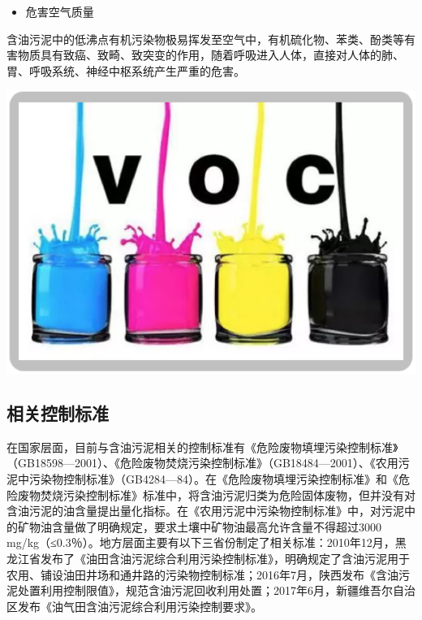 \documentclass[]{book}
\providecommand{\tightlist}{%
  \setlength{\itemsep}{0pt}\setlength{\parskip}{0pt}}
\begin{document}
\begin{itemize}
\tightlist
\item
  危害空气质量
\end{itemize}

含油污泥中的低沸点有机污染物极易挥发至空气中，有机硫化物、苯类、酚类等有害物质具有致癌、致畸、致突变的作用，随着呼吸进入人体，直接对人体的肺、胃、呼吸系统、神经中枢系统产生严重的危害。

\includegraphics[width=8.33in]{images/youni7}

\hypertarget{ux76f8ux5173ux63a7ux5236ux6807ux51c6}{%
\subsection{相关控制标准}\label{ux76f8ux5173ux63a7ux5236ux6807ux51c6}}

在国家层面，目前与含油污泥相关的控制标准有《危险废物填埋污染控制标准》（GB18598---2001）、《危险废物焚烧污染控制标准》（GB18484---2001）、《农用污泥中污染物控制标准》（GB4284---84）。在《危险废物填埋污染控制标准》和《危险废物焚烧污染控制标准》标准中，将含油污泥归类为危险固体废物，但并没有对含油污泥的油含量提出量化指标。在《农用污泥中污染物控制标准》中，对污泥中的矿物油含量做了明确规定，要求土壤中矿物油最高允许含量不得超过3000 mg/kg（≤0.3％）。地方层面主要有以下三省份制定了相关标准：2010年12月，黑龙江省发布了《油田含油污泥综合利用污染控制标准》，明确规定了含油污泥用于农用、铺设油田井场和通井路的污染物控制标准；2016年7月，陕西发布《含油污泥处置利用控制限值》，规范含油污泥回收利用处置；2017年6月，新疆维吾尔自治区发布《油气田含油污泥综合利用污染控制要求》。
\end{document}
